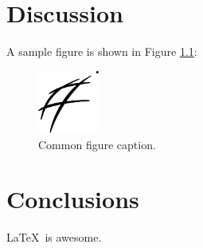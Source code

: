 \chapter{Discussion}

A sample figure is shown in Figure \ref{fig:sample_figure}:

\begin{figure}
	\centering
	\includegraphics[width=2cm]{logos/EnvSci}
	\caption{Common figure caption.}
	\label{fig:sample_figure}
\end{figure}

\chapter{Conclusions}

\LaTeX\ is awesome.